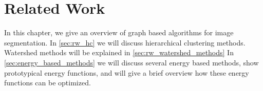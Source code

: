 \chapter{Related Work} \label{ch:reated_work}

In this chapter, we give an overview of graph based algorithms
for image segmentation.
In \cref{sec:rw_hc} we will discuss hierarchical clustering 
methods.
Watershed methods will be explained in \cref{sec:rw_watershed_methods}
In \cref{sec:energy_based_methods} we will discuss
several energy based methods, show prototypical energy functions, and
will give a brief overview how these energy functions can
be optimized.




% 

 

 

 

% 

% 






